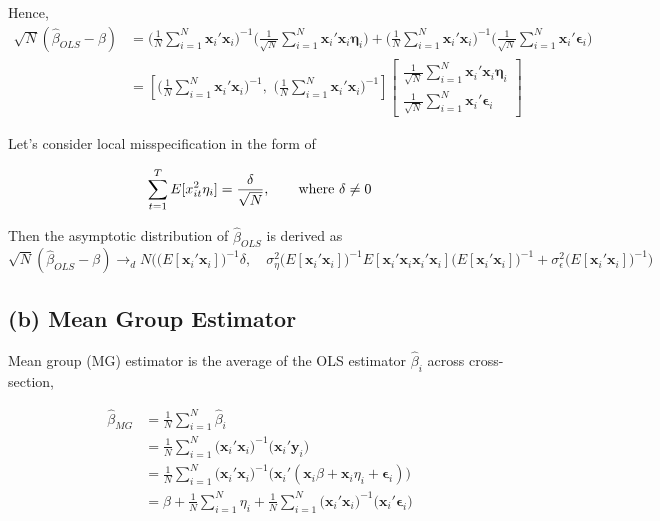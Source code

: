 Hence, 
\begin{align*}
\sqrt{N}(\widehat{\beta}_{OLS} - \beta) & = \bigg(\frac{1}{N}\sum_{i=1}^{N} \mathbf{x}_i'  \mathbf{x}_i\bigg)^{-1}\bigg(\frac{1}{\sqrt{N}}\sum_{i=1}^{N} \mathbf{x}_i'\mathbf{x}_i\mathbf{\eta}_i   \bigg)+ \bigg(\frac{1}{N}\sum_{i=1}^{N} \mathbf{x}_i'  \mathbf{x}_i\bigg)^{-1}\bigg(\frac{1}{\sqrt{N}}\sum_{i=1}^{N} \mathbf{x}_i'\mathbf{\epsilon}_i   \bigg)\\
&= \left[\bigg(\frac{1}{N}\sum_{i=1}^{N} \mathbf{x}_i'  \mathbf{x}_i\bigg)^{-1}, \,\, \bigg(\frac{1}{N}\sum_{i=1}^{N} \mathbf{x}_i'  \mathbf{x}_i\bigg)^{-1} \right] \begin{bmatrix}
\frac{1}{\sqrt{N}}\sum_{i=1}^{N} \mathbf{x}_i'\mathbf{x}_i\mathbf{\eta}_i   \\
\frac{1}{\sqrt{N}}\sum_{i=1}^{N} \mathbf{x}_i'\mathbf{\epsilon}_i   
\end{bmatrix}
\end{align*}


Let's consider local misspecification in the form of

\[
\sum_{t=1}^T E[x_{it}^2 \eta_i] = \frac{\delta}{\sqrt{N}}, \qquad \text{where\,\,}  \delta \neq 0
\]
\vspace{0.2in}

Then the asymptotic distribution of $\widehat{\beta}_{OLS}$ is derived as
\[
\sqrt{N} (\widehat{\beta}_{OLS}-\beta) \rightarrow_{d} N\bigg(\big(E[\mathbf{x}_i'\mathbf{x}_i]\big)^{-1}\delta,\quad \sigma_\eta^2 \big(E[\mathbf{x}_i'\mathbf{x}_i]\big)^{-1}E[\mathbf{x}_i'\mathbf{x}_i\mathbf{x}_i'  \mathbf{x}_i]\big(E[\mathbf{x}_i'\mathbf{x}_i]\big)^{-1} + \sigma_\epsilon^2 \big(E[\mathbf{x}_i'\mathbf{x}_i]\big)^{-1}   \bigg)
\]

\subsection*{(b) Mean Group Estimator}

\vspace{0.2in}

Mean group (MG) estimator is the average of the OLS estimator $\widehat{\beta}_i$ across cross-section,


\begin{align*}
\widehat{\beta}_{MG} & = \frac{1}{N}\sum_{i=1}^N \widehat{\beta}_i\\
&= \frac{1}{N} \sum_{i=1}^N \bigg( \mathbf{x}_i'  \mathbf{x}_i\bigg)^{-1}\bigg( \mathbf{x}_i'  \mathbf{y}_i   \bigg)\\
&= \frac{1}{N} \sum_{i=1}^N \bigg( \mathbf{x}_i'  \mathbf{x}_i\bigg)^{-1}\bigg( \mathbf{x}_i' ( \mathbf{x}_i \beta + \mathbf{x}_i \eta_i+ \mathbf{\epsilon}_i)   \bigg)\\
&= \beta + \frac{1}{N}\sum_{i=1}^N\eta_i+ \frac{1}{N}\sum_{i=1}^N \bigg( \mathbf{x}_i'  \mathbf{x}_i\bigg)^{-1} \bigg( \mathbf{x}_i' \mathbf{\epsilon}_i\bigg)
\end{align*}

